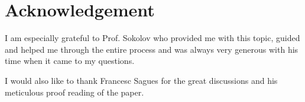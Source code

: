 
\chapter*{Acknowledgement}

I am especially grateful to Prof. Sokolov who provided me with this topic, guided and helped me through the entire process and was always very generous with his time when it came to my questions.

I would also like to thank Francesc Sagues for the great discussions and his meticulous proof reading of the paper.
